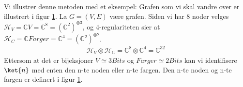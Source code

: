 \begin{figure}
\begin{center}
\begin{tcolorbox}
\begin{subfigure}{0.2451065\textwidth}
                    \end{subfigure}
                    \begin{subfigure}{0.2451065\textwidth}
                    \end{subfigure}
                \end{tcolorbox}
            \end{center}
            \label{fig:d-reg}
        \end{figure}

        Vi illustrer denne metoden med et eksempel: Grafen som vi skal vandre over er illustrert i figur \ref{fig:d-reg}. La $G=(V,E)$ være grafen. Siden vi har $8$ noder velges $\mathcal{H}_V=\mathbb{C}V=\mathbb{C}^8={(\mathbb{C}^{2})}^{\otimes 3}$, og $4$-regulariteten sier at $\mathcal{H}_C=\mathbb{C}Farger=\mathbb{C}^4={(\mathbb{C}^{2})}^{\otimes 2}$.
        \begin{align*}
            \mathcal{H}_V\otimes\mathcal{H}_C=\mathbb{C}^8\otimes\mathbb{C}^4=\mathbb{C}^{32}
        \end{align*}
        Ettersom at det er bijeksjoner $V\simeq 3Bits$ og $Farger\simeq 2Bits$ kan vi identifisere $\ket{n}$ med enten den n-te noden eller n-te fargen. Den n-te noden og n-te fargen er definert i figur \ref{fig:d-reg}.

